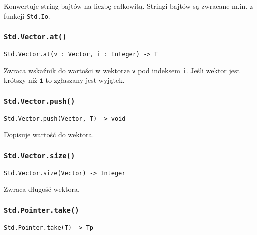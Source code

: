 Konwertuje string bajtów na liczbę całkowitą. Stringi bajtów są zwracane m.in. z
funkcji \texttt{Std.Io}.

\subsubsection{\texttt{Std.Vector.at()}}

\begin{small}
\begin{lstlisting}
Std.Vector.at(v : Vector, i : Integer) -> T
\end{lstlisting}
\end{small}

Zwraca wskaźnik do wartości w wektorze \texttt{v} pod indeksem \texttt{i}. Jeśli
wektor jest krótszy niż \texttt{i} to zgłaszany jest wyjątek.

\subsubsection{\texttt{Std.Vector.push()}}

\begin{small}
\begin{lstlisting}
Std.Vector.push(Vector, T) -> void
\end{lstlisting}
\end{small}

Dopisuje wartość do wektora.

\subsubsection{\texttt{Std.Vector.size()}}

\begin{small}
\begin{lstlisting}
Std.Vector.size(Vector) -> Integer
\end{lstlisting}
\end{small}

Zwraca długość wektora.

\subsubsection{\texttt{Std.Pointer.take()}}

\begin{small}
\begin{lstlisting}
Std.Pointer.take(T) -> Tp
\end{lstlisting}
\end{small}

